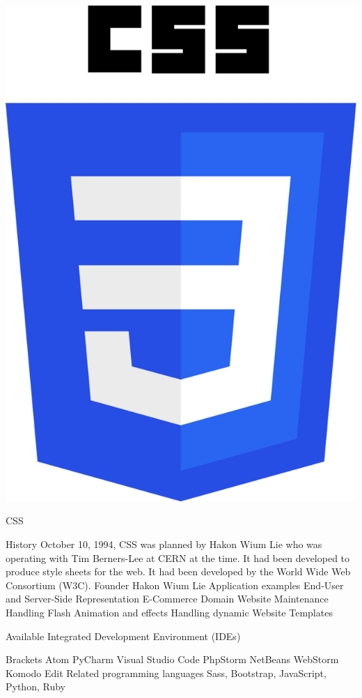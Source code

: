 \documentclass{article}
\begin{document}
{\newpage
\includegraphics[width=\linewidth,height=\linewidth]{Picture2.png}
\centering
\begin{tcolorbox}[width=\linewidth,colback={blue},outer arc=0mm,colupper=white]    
	\huge CSS
\end{tcolorbox} 

\newpage
History
October 10, 1994, CSS was planned by Hakon Wium Lie who was operating with Tim Berners-Lee at CERN at the time.
It had been developed to produce style sheets for the web.
It had been developed by the World Wide Web Consortium (W3C).
Founder
Hakon Wium Lie
Application examples
End-User and Server-Side Representation
E-Commerce Domain
Website Maintenance
Handling Flash Animation and effects
Handling dynamic Website Templates

Available Integrated Development Environment (IDEs) 

Brackets
Atom
PyCharm
Visual Studio Code
PhpStorm
NetBeans
WebStorm
Komodo Edit
Related programming languages
Sass, Bootstrap, JavaScript, Python, Ruby

}
\end{document}
